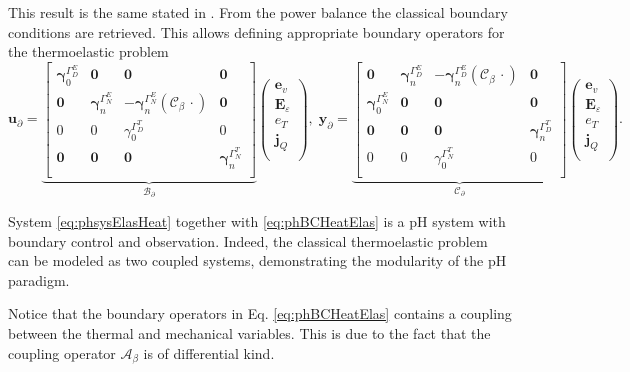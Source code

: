 This result is the same stated in \cite[page 332]{carlson1973}. From the power balance the classical boundary conditions are retrieved. This allows defining appropriate boundary operators for the thermoelastic problem
\begin{equation}\label{eq:phBCHeatElas}
	\bm{u}_\partial = 
	\underbrace{\begin{bmatrix}
	\bm{\gamma}_{0}^{\Gamma_D^E} & \bm{0} & \bm{0} & \bm{0} \\
	\bm{0} & \bm{\gamma}_n^{\Gamma_N^E} & - \bm{\gamma}_n^{\Gamma_N^E}(\bm{\mathcal{C}}_\beta\, \cdot )  & \bm{0}  \\ 
	{0} & {0} & {\gamma}_{0}^{\Gamma_D^T} & {0} \\
	\bm{0} & \bm{0} & \bm{0} & \bm{\gamma}_{n}^{\Gamma_N^T} \\
	\end{bmatrix}}_{\mathcal{B}_\partial}
	\begin{pmatrix}
	\bm{e}_v \\
	\bm{E}_\varepsilon \\
	{e}_T \\
	\bm{j}_Q \\
	\end{pmatrix}, \; 
	\bm{y}_\partial = 
	\underbrace{\begin{bmatrix}
		\bm{0} & \bm{\gamma}_n^{\Gamma_D^E} & - \bm{\gamma}_n^{\Gamma_D^E}(\bm{\mathcal{C}}_\beta\, \cdot )  & \bm{0}  \\ 
		\bm{\gamma}_{0}^{\Gamma_N^E} & \bm{0} & \bm{0} & \bm{0} \\
		\bm{0} & \bm{0} & \bm{0} & \bm{\gamma}_{n}^{\Gamma_D^T} \\
		{0} & {0} & {\gamma}_{0}^{\Gamma_N^T} & {0} \\
		\end{bmatrix}}_{\mathcal{C}_\partial}
	\begin{pmatrix}
	\bm{e}_v \\
	\bm{E}_\varepsilon \\
	{e}_T \\
	\bm{j}_Q \\
	\end{pmatrix}.
\end{equation} 

System \eqref{eq:phsysElasHeat} together with \eqref{eq:phBCHeatElas} is a pH system with boundary control and observation. Indeed, the classical thermoelastic problem can be modeled as two coupled systems, demonstrating the modularity of the pH paradigm.

\begin{remark}
	Notice that the boundary operators in Eq. \eqref{eq:phBCHeatElas} contains a coupling between the thermal and mechanical variables. This is due to the fact that the coupling operator $\mathcal{A}_\beta$ is of differential kind.
\end{remark}

